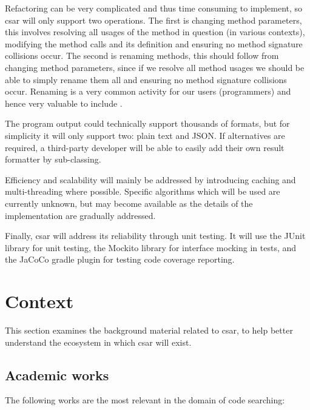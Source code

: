 \documentclass[12pt, letterpaper]{article}
\begin{document}
Refactoring can be very complicated and thus time consuming to implement, so csar will only support two operations.
The first is changing method parameters, this involves resolving all usages of the method in question (in various contexts), modifying the method calls and its definition and ensuring no method signature collisions occur.
The second is renaming methods, this should follow from changing method parameters, since if we resolve all method usages we should be able to simply rename them all and ensuring no method signature collisions occur.
Renaming is a very common activity for our users (programmers) and hence very valuable to include \autocite{murphy2012we}.

The program output could technically support thousands of formats, but for simplicity it will only support two: plain text and JSON.
If alternatives are required, a third-party developer will be able to easily add their own result formatter by sub-classing.

Efficiency and scalability will mainly be addressed by introducing caching and multi-threading where possible.
Specific algorithms which will be used are currently unknown, but may become available as the details of the implementation are gradually addressed.

Finally, csar will address its reliability through unit testing.
It will use the JUnit library for unit testing, the Mockito library for interface mocking in tests, and the JaCoCo gradle plugin for testing code coverage reporting.

\section{Context}
This section examines the background material related to csar, to help better understand the ecosystem in which csar will exist.

\subsection{Academic works}
The following works are the most relevant in the domain of code searching:
\end{document}
